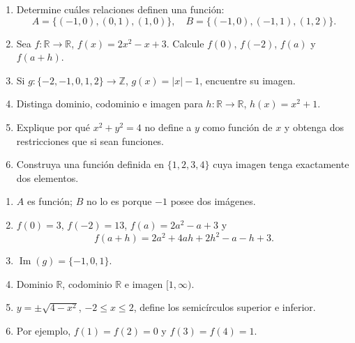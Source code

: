 \begin{ejercicios}
\begin{enumerate}
  \item Determine cuáles relaciones definen una función:
  \[
  A=\{(-1,0),(0,1),(1,0)\},\quad
  B=\{(-1,0),(-1,1),(1,2)\}.
  \]
  \item Sea $f:\mathbb{R}\to\mathbb{R}$, $f(x)=2x^2-x+3$. Calcule $f(0)$, $f(-2)$, $f(a)$ y $f(a+h)$.
  \item Si $g:\{-2,-1,0,1,2\}\to\mathbb{Z}$, $g(x)=|x|-1$, encuentre su imagen.
  \item Distinga dominio, codominio e imagen para $h:\mathbb{R}\to\mathbb{R}$, $h(x)=x^2+1$.
  \item Explique por qué $x^2+y^2=4$ no define a $y$ como función de $x$ y obtenga dos restricciones que si sean funciones.
  \item Construya una función definida en $\{1,2,3,4\}$ cuya imagen tenga exactamente dos elementos.
\end{enumerate}
\end{ejercicios}

\ifmostrarSoluciones
\begin{solucion}
\begin{enumerate}
  \item $A$ es función; $B$ no lo es porque $-1$ posee dos imágenes.
  \item $f(0)=3$, $f(-2)=13$, $f(a)=2a^2-a+3$ y
  \[
  f(a+h)=2a^2+4ah+2h^2-a-h+3.
  \]
  \item $\operatorname{Im}(g)=\{-1,0,1\}$.
  \item Dominio $\mathbb{R}$, codominio $\mathbb{R}$ e imagen $[1,\infty)$.
  \item $y=\pm\sqrt{4-x^2}$, $-2\leq x\leq2$, define los semicírculos superior e inferior.
  \item Por ejemplo, $f(1)=f(2)=0$ y $f(3)=f(4)=1$.
\end{enumerate}
\end{solucion}
\fi

\ifdefined\documentoSemanal
\else

\fi
